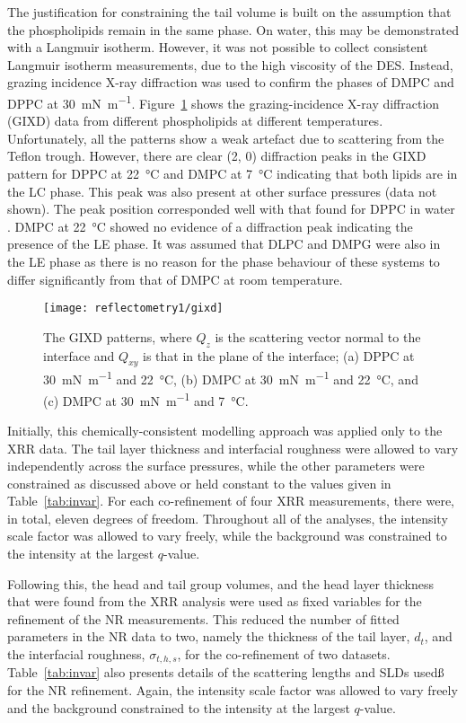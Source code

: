 The justification for constraining the tail volume is built on the assumption that the phospholipids remain in the same phase.
On water, this may be demonstrated with a Langmuir isotherm.
However, it was not possible to collect consistent Langmuir isotherm measurements, due to the high viscosity of the DES.
Instead, grazing incidence X-ray diffraction was used to confirm the phases of DMPC and DPPC at \SI{30}{\milli\newton\per\meter}.
Figure~\ref{fig:gixd} shows the grazing-incidence X-ray diffraction (GIXD) data from different phospholipids at different temperatures.
Unfortunately, all the patterns show a weak artefact due to scattering from the Teflon trough.
However, there are clear (2, 0) diffraction peaks in the GIXD pattern for DPPC at \SI{22}{\celsius} and DMPC at \SI{7}{\celsius} indicating that both lipids are in the LC phase.
This peak was also present at other surface pressures (data not shown).
The peak position corresponded well with that found for DPPC in water \cite{watkins_structure_2009}.
DMPC at \SI{22}{\celsius} showed no evidence of a diffraction peak indicating the presence of the LE phase.
It was assumed that DLPC and DMPG were also in the LE phase as there is no reason for the phase behaviour of these systems to differ significantly from that of DMPC at room temperature.
%
\begin{figure}
    \centering
    \texttt{[image: reflectometry1/gixd]}
    \caption{The GIXD patterns, where $Q_z$ is the scattering vector normal to the interface and $Q_{xy}$ is that in the plane of the interface; (a) DPPC at \SI{30}{\milli\newton\per\meter} and \SI{22}{\celsius}, (b) DMPC at \SI{30}{\milli\newton\per\meter} and \SI{22}{\celsius}, and (c) DMPC at \SI{30}{\milli\newton\per\meter} and \SI{7}{\celsius}.}
    \label{fig:gixd}
\end{figure}
%

Initially, this chemically-consistent modelling approach was applied only to the XRR data.
The tail layer thickness and interfacial roughness were allowed to vary independently across the surface pressures, while the other parameters were constrained as discussed above or held constant to the values given in Table~\ref{tab:invar}.
For each co-refinement of four XRR measurements, there were, in total, eleven degrees of freedom.
Throughout all of the analyses, the intensity scale factor was allowed to vary freely, while the background was constrained to the intensity at the largest $q$-value.

Following this, the head and tail group volumes, and the head layer thickness that were found from the XRR analysis were used as fixed variables for the refinement of the NR measurements.
This reduced the number of fitted parameters in the NR data to two, namely the thickness of the tail layer, $d_t$, and the interfacial roughness, $\sigma_{t,h,s}$, for the co-refinement of two datasets.
Table~\ref{tab:invar} also presents details of the scattering lengths and SLDs usedß for the NR refinement.
Again, the intensity scale factor was allowed to vary freely and the background constrained to the intensity at the largest $q$-value.

